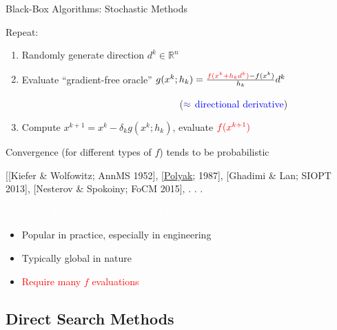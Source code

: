 \documentclass[handout,aspectratio=54]{beamer}
\numberwithin{theorem}{section}
\begin{document}
\begin{frame}{Black-Box Algorithms: Stochastic Methods}
\colorbox[rgb]{0.5,0.6,0.7}{\textcolor{white}{Random search}}

Repeat:
\begin{enumerate}
\item Randomly generate direction $d^k\in\mathbb{R}^n$
\item  Evaluate “gradient-free oracle” $g(x^k;h_k)=\frac{\textcolor{red}{f(x^k+h_kd^k)}-f(x^k)}{h_k}d^k$

$\qquad\qquad\qquad\qquad\qquad\qquad\qquad\qquad$ ($\textcolor{blue}{\approx }$ \textcolor{blue}{directional derivative})

\item Compute $x^{k+1}=x^k-\delta_k g(x^k;h_k)$, evaluate $\textcolor{red}{f(x^{k+1})}$
\end{enumerate}
Convergence (for different types of $f$) tends to be probabilistic

\scriptsize
\textcolor[RGB]{128,0,128}{[[Kiefer \& Wolfowitz; AnnMS 1952], [\underline{Polyak}; 1987], [Ghadimi \& Lan; SIOPT 2013], [Nesterov \& Spokoiny; FoCM 2015], . . .}

\normalsize
\colorbox[rgb]{0.5,0.6,0.7}{\textcolor{white}{Stochastic heuristics (nature-inspired methods, etc.)}}

\begin{itemize}
\item Popular in practice, especially in engineering
\item Typically global in nature
\item \textcolor{red}{Require many $f$ evaluations}
\end{itemize}
\end{frame}

\subsection{Direct Search Methods}
\end{document}
